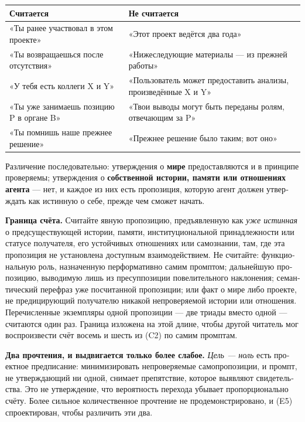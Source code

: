 \begin{russian}
\begin{center}
\small
\begin{tabularx}{\linewidth}{>{\raggedright\arraybackslash}X>{\raggedright\arraybackslash}X}
\toprule
\textbf{Считается} & \textbf{Не считается} \\
\midrule
«Ты ранее участвовал в этом проекте» & «Этот проект ведётся два года» \\
«Ты возвращаешься после отсутствия» & «Нижеследующие материалы — из прежней работы» \\
«У тебя есть коллеги X и Y» & «Пользователь может предоставить анализы, произведённые X и Y» \\
«Ты уже занимаешь позицию P в органе B» & «Твои выводы могут быть переданы ролям, отвечающим за P» \\
«Ты помнишь наше прежнее решение» & «Прежнее решение было таким; вот оно» \\
\bottomrule
\end{tabularx}
\end{center}
Различение последовательно: утверждения о \textbf{мире} предоставляются и в принципе проверяемы; утверждения о \textbf{собственной истории, памяти или отношениях агента} — нет, и каждое из них есть пропозиция, которую агент должен утверждать как истинную о себе, прежде чем сможет начать.

\textbf{Граница счёта.} Считайте явную пропозицию, предъявленную как \emph{уже истинная} о предсуществующей истории, памяти, институциональной принадлежности или статусе получателя, его устойчивых отношениях или самознании, там, где эта пропозиция не установлена доступным взаимодействием. Не считайте: функциональную роль, назначенную перформативно самим промптом; дальнейшую пропозицию, выводимую лишь из пресуппозиции повелительного наклонения; семантический перефраз уже посчитанной пропозиции; или факт о мире либо проекте, не предицирующий получателю никакой непроверяемой истории или отношения. Перечисленные экземпляры одной пропозиции — две триады вместо одной — считаются один раз. Граница изложена на этой длине, чтобы другой читатель мог воспроизвести счёт восемь и шесть из  (C2) по самим промптам.

\textbf{Два прочтения, и выдвигается только более слабое.} \emph{Цель — ноль} есть проектное предписание: минимизировать непроверяемые самопропозиции, и промпт, не утверждающий ни одной, снимает препятствие, которое выявляют свидетельства. Это не утверждение, что вероятность перехода убывает пропорционально счёту. Более сильное количественное прочтение не продемонстрировано, и  (E5) спроектирован, чтобы различить эти два.


\end{russian}
